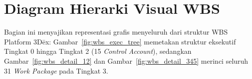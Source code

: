 \documentclass[11pt,a4paper]{article}
\renewcommand{\figurename}{Gambar}
\begin{document}
\clearpage

\section{Diagram Hierarki Visual WBS}

Bagian ini menyajikan representasi grafis menyeluruh dari struktur WBS Platform 3D\={e}x: \figurename~\ref{fig:wbs_exec_tree} memetakan struktur eksekutif Tingkat 0 hingga Tingkat 2 (15 \textit{Control Account}), sedangkan \figurename~\ref{fig:wbs_detail_12} dan \figurename~\ref{fig:wbs_detail_345} merinci seluruh 31 \textit{Work Package} pada Tingkat 3.
\end{document}
